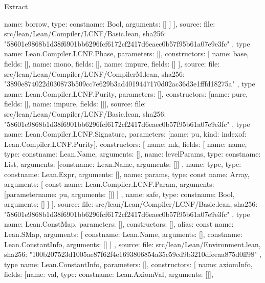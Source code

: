 \begin{lexlean}{Extract}
\begin{toolingmodule}
{{{            {name: borrow, type: const{name: Bool, arguments: []}}
          ]
        }
      ],
      source: {
        file: src/lean/Lean/Compiler/LCNF/Basic.lean,
        sha256: "58601e9868b1d38f6901bb6296fcf6172cf2417d6eaec0b57f95b61a07e9e3fc"
      }
    },
    type{
      name: Lean.Compiler.LCNF.Phase,
      parameters: [],
      constructors: [
        {name: base, fields: []},
        {name: mono, fields: []},
        {name: impure, fields: []}
      ],
      source: {
        file: src/lean/Lean/Compiler/LCNF/CompilerM.lean,
        sha256: "3890e874022d030873b509cc7e629b3ad4019447170d02ac36d3e1fffd18275a"
      }
    },
    type{
      name: Lean.Compiler.LCNF.Purity,
      parameters: [],
      constructors: [{name: pure, fields: []}, {name: impure, fields: []}],
      source: {
        file: src/lean/Lean/Compiler/LCNF/Basic.lean,
        sha256: "58601e9868b1d38f6901bb6296fcf6172cf2417d6eaec0b57f95b61a07e9e3fc"
      }
    },
    type{
      name: Lean.Compiler.LCNF.Signature,
      parameters: [{name: pu, kind: index{of: Lean.Compiler.LCNF.Purity}}],
      constructors: [
        {
          name: mk,
          fields: [
            {name: name, type: const{name: Lean.Name, arguments: []}},
            {
              name: levelParams,
              type: const{name: List, arguments: [const{name: Lean.Name, arguments: []}]}
            },
            {name: type, type: const{name: Lean.Expr, arguments: []}},
            {
              name: params,
              type: const{
                name: Array,
                arguments: [
                  const{
                    name: Lean.Compiler.LCNF.Param,
                    arguments: [parameter{name: pu, arguments: []}]
                  }
                ]
              }
            },
            {name: safe, type: const{name: Bool, arguments: []}}
          ]
        }
      ],
      source: {
        file: src/lean/Lean/Compiler/LCNF/Basic.lean,
        sha256: "58601e9868b1d38f6901bb6296fcf6172cf2417d6eaec0b57f95b61a07e9e3fc"
      }
    },
    type{
      name: Lean.ConstMap,
      parameters: [],
      constructors: [],
      alias: const{
        name: Lean.SMap,
        arguments: [
          const{name: Lean.Name, arguments: []},
          const{name: Lean.ConstantInfo, arguments: []}
        ]
      },
      source: {
        file: src/lean/Lean/Environment.lean,
        sha256: "100b207523d1005ae87f62f4e1693806854a35c59cd9b3210dfeeaa875d0ff98"
      }
    },
    type{
      name: Lean.ConstantInfo,
      parameters: [],
      constructors: [
        {name: axiomInfo, fields: [{name: val, type: const{name: Lean.AxiomVal, arguments: []}}]},
}}
\end{toolingmodule}
\end{lexlean}
